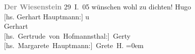 \begin{ledgroupsized}[t]{13cm}
           \pstart
           \noindent{}\centering{}\textcolor{gray}{\textbf{Der Wiesenstein}}\pend
           \pstart
           \raggedleft{}29 I. 05\pend
           \pstart
           wünschen wohl zu dichten!\pend
           \pstart
           \spacefill\mbox{Hugo}{\\[\baselineskip]}{[}hs. Gerhart Hauptmann:{]} u{\\[\baselineskip]}\spacefill\mbox{Gerhart}{\\[\baselineskip]}\spacefill\mbox{{[}hs. Gertrude von Hofmannsthal:{]} Gerty}{\\[\baselineskip]}\spacefill\mbox{{[}hs. Margarete Hauptmann:{]} Grete H.}\pend
           \leftskip=0em{}
         
         \endnumbering{}\end{ledgroupsized}  \newcommand{\dateiname}{L01497}\newcommand{\titel}{Hugo und Gerty von Hofmannsthal, Gerhart und Margarete Hauptmann an Arthur Schnitzler, 29. 1. 1905}\newcommand{\editorInnen}{Martin Anton Müller und Gerd-Hermann Susen}
      
